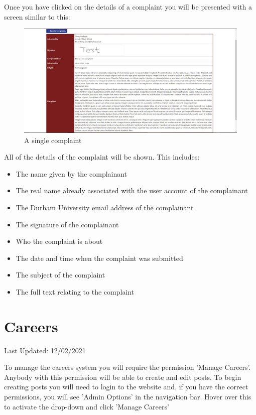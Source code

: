 \documentclass{article}
\begin{document}
Once you have clicked on the details of a complaint you will be presented with a screen similar to this:
\begin{figure}[H]
    \centering
    \includegraphics[width=\textwidth,height=\textheight,keepaspectratio]{complaints/complaints_single.png}
    \caption{A single complaint}
    \label{fig:complaints_single}
\end{figure}
All of the details of the complaint will be shown. This includes:
\begin{itemize}
    \item The name given by the complainant
    \item The real name already associated with the user account of the complainant
    \item The Durham University email address of the complainant
    \item The signature of the complainant
    \item Who the complaint is about 
    \item The date and time when the complaint was submitted
    \item The subject of the complaint
    \item The full text relating to the complaint
\end{itemize}

\newpage
\section{Careers}
Last Updated: 12/02/2021

To manage the careers system you will require the permission 'Manage Careers'. Anybody with this permission will be able to create and edit posts. To begin creating posts you will need to login to the website and, if you have the correct permissions, you will see 'Admin Options' in the navigation bar. Hover over this to activate the drop-down and click 'Manage Careers'
\end{document}
